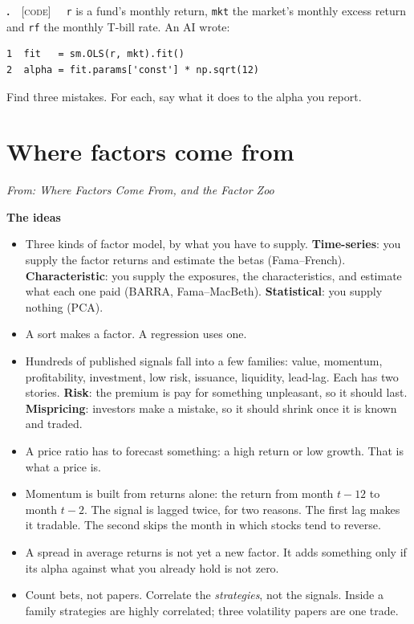 \documentclass[11pt]{article}
\newcounter{ex}[section]
\renewcommand{\theex}{\thesection.\arabic{ex}}
\newenvironment{ex}[1][calculation]{\refstepcounter{ex}\par\medskip\textbf{\theex}\ \ {\small\textsc{[#1]}}\ \ }{\par}
\newcommand{\head}[1]{\par\medskip\textbf{#1}\par}
\begin{document}
\begin{ex}[code]\label{ex:3.6}
\texttt{r} is a fund's monthly return, \texttt{mkt} the market's monthly excess return and \texttt{rf} the monthly T-bill
rate. An AI wrote:
\begin{verbatim}
1  fit   = sm.OLS(r, mkt).fit()
2  alpha = fit.params['const'] * np.sqrt(12)
\end{verbatim}
Find three mistakes. For each, say what it does to the alpha you report.
\end{ex}

\section{Where factors come from}
{\small\emph{From: Where Factors Come From, and the Factor Zoo}}

\head{The ideas}
\begin{itemize}
\item Three kinds of factor model, by what you have to supply. \textbf{Time-series}: you supply the factor returns and
estimate the betas (Fama--French). \textbf{Characteristic}: you supply the exposures, the characteristics, and
estimate what each one paid (BARRA, Fama--MacBeth). \textbf{Statistical}: you supply nothing (PCA).
\item A sort makes a factor. A regression uses one.
\item Hundreds of published signals fall into a few families: value, momentum, profitability, investment, low risk,
issuance, liquidity, lead-lag. Each has two stories. \textbf{Risk}: the premium is pay for something unpleasant, so it
should last. \textbf{Mispricing}: investors make a mistake, so it should shrink once it is known and traded.
\item A price ratio has to forecast something: a high return or low growth. That is what a price is.
\item Momentum is built from returns alone: the return from month $t-12$ to month $t-2$. The signal is lagged twice, for
two reasons. The first lag makes it tradable. The second skips the month in which stocks tend to reverse.
\item A spread in average returns is not yet a new factor. It adds something only if its alpha against what you already
hold is not zero.
\item Count bets, not papers. Correlate the \emph{strategies}, not the signals. Inside a family strategies are highly
correlated; three volatility papers are one trade.
\end{itemize}
\end{document}
